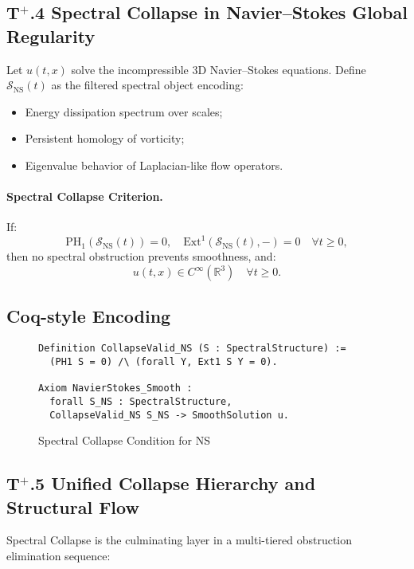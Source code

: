 \documentclass[11pt]{article}
\begin{document}
\subsection*{T$^{+}$.4 Spectral Collapse in Navier–Stokes Global Regularity}

Let $u(t,x)$ solve the incompressible 3D Navier–Stokes equations. Define $\mathcal{S}_{\mathrm{NS}}(t)$ as the filtered spectral object encoding:

\begin{itemize}
    \item Energy dissipation spectrum over scales;
    \item Persistent homology of vorticity;
    \item Eigenvalue behavior of Laplacian-like flow operators.
\end{itemize}

\paragraph{Spectral Collapse Criterion.}
If:
\[
\mathrm{PH}_1(\mathcal{S}_{\mathrm{NS}}(t)) = 0, \quad \mathrm{Ext}^1(\mathcal{S}_{\mathrm{NS}}(t), -) = 0 \quad \forall t \geq 0,
\]
then no spectral obstruction prevents smoothness, and:
\[
u(t,x) \in C^\infty(\mathbb{R}^3) \quad \forall t \geq 0.
\]

\subsection*{Coq-style Encoding}

\begin{figure}[H]
\centering
\begin{lstlisting}[language=Coq]
Definition CollapseValid_NS (S : SpectralStructure) :=
  (PH1 S = 0) /\ (forall Y, Ext1 S Y = 0).

Axiom NavierStokes_Smooth :
  forall S_NS : SpectralStructure,
  CollapseValid_NS S_NS -> SmoothSolution u.
\end{lstlisting}
\caption{Spectral Collapse Condition for NS}
\end{figure}


\subsection*{T$^{+}$.5 Unified Collapse Hierarchy and Structural Flow}

Spectral Collapse is the culminating layer in a multi-tiered obstruction elimination sequence:
\end{document}
